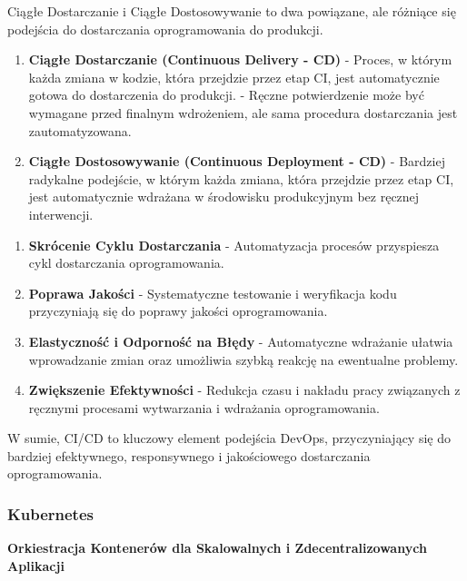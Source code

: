 
\noindent Ciągłe Dostarczanie i Ciągłe Dostosowywanie to dwa powiązane, ale różniące się podejścia do dostarczania oprogramowania do produkcji.

\begin{enumerate}
\item {\bf Ciągłe Dostarczanie (Continuous Delivery - CD)}
   - Proces, w którym każda zmiana w kodzie, która przejdzie przez etap CI, jest automatycznie gotowa do dostarczenia do produkcji.
   - Ręczne potwierdzenie może być wymagane przed finalnym wdrożeniem, ale sama procedura dostarczania jest zautomatyzowana.

\item {\bf Ciągłe Dostosowywanie (Continuous Deployment - CD)}
   - Bardziej radykalne podejście, w którym każda zmiana, która przejdzie przez etap CI, jest automatycznie wdrażana w środowisku produkcyjnym bez ręcznej interwencji.
\end{enumerate}


\begin{enumerate}
\item {\bf Skrócenie Cyklu Dostarczania}
   - Automatyzacja procesów przyspiesza cykl dostarczania oprogramowania.

\item {\bf Poprawa Jakości}
   - Systematyczne testowanie i weryfikacja kodu przyczyniają się do poprawy jakości oprogramowania.

\item {\bf Elastyczność i Odporność na Błędy}
   - Automatyczne wdrażanie ułatwia wprowadzanie zmian oraz umożliwia szybką reakcję na ewentualne problemy.

\item {\bf Zwiększenie Efektywności}
   - Redukcja czasu i nakładu pracy związanych z ręcznymi procesami wytwarzania i wdrażania oprogramowania.
\end{enumerate}

W sumie, CI/CD to kluczowy element podejścia DevOps, przyczyniający się do bardziej efektywnego, responsywnego i jakościowego dostarczania oprogramowania.
\subsubsection{Kubernetes}

{\bf Orkiestracja Kontenerów dla Skalowalnych i Zdecentralizowanych Aplikacji}

